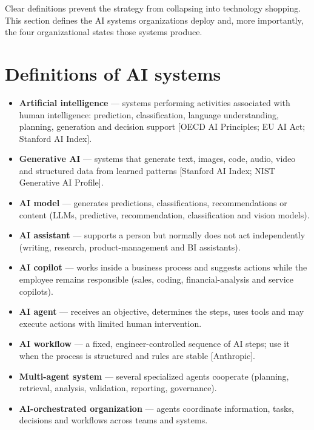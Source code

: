 
Clear definitions prevent the strategy from collapsing into technology
shopping. This section defines the AI systems organizations deploy and, more
importantly, the four organizational states those systems produce.

\section{Definitions of AI systems}

\begin{itemize}
  \item \textbf{Artificial intelligence} — systems performing activities
        associated with human intelligence: prediction, classification,
        language understanding, planning, generation and decision support
        [OECD AI Principles; EU AI Act; Stanford AI Index].
  \item \textbf{Generative AI} — systems that generate text, images, code,
        audio, video and structured data from learned patterns
        [Stanford AI Index; NIST Generative AI Profile].
  \item \textbf{AI model} — generates predictions, classifications,
        recommendations or content (LLMs, predictive, recommendation,
        classification and vision models).
  \item \textbf{AI assistant} — supports a person but normally does not act
        independently (writing, research, product-management and BI
        assistants).
  \item \textbf{AI copilot} — works inside a business process and suggests
        actions while the employee remains responsible (sales, coding,
        financial-analysis and service copilots).
  \item \textbf{AI agent} — receives an objective, determines the steps,
        uses tools and may execute actions with limited human intervention.
  \item \textbf{AI workflow} — a fixed, engineer-controlled sequence of AI
        steps; use it when the process is structured and rules are stable
        [Anthropic].
  \item \textbf{Multi-agent system} — several specialized agents cooperate
        (planning, retrieval, analysis, validation, reporting, governance).
  \item \textbf{AI-orchestrated organization} — agents coordinate
        information, tasks, decisions and workflows across teams and systems.
\end{itemize}

